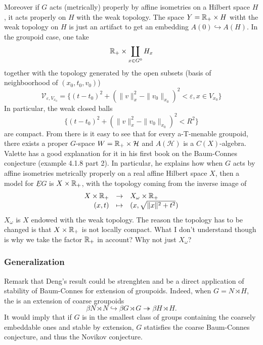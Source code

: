 Moreover if $G$ acts (metrically) properly by affine isometries on a Hilbert space $H$, it acts properly on $H$ with the weak topology. The space $Y = \mathbb R_+ \times H$ witht the weak topology on $H$ is just an artifact to get an embedding $A(0) \hookrightarrow A(H)$. In the groupoid case, one take
\[ \mathbb R_+ \times \coprod_{x\in G^0} H_x\]
together with the topology generated by the open subsets (basis of neighboorhood of $(x_0,t_0,v_0)$)
\[ \mathcal V_{\varepsilon, V_{x_0}} = \{ (t-t_0)^2 + (\| v\|_x^2 - \| v_0\|_{x_0} )^2 < \varepsilon , x\in V_{x_0}\} \]
In particular, the weak closed balls
\[  \{ (t-t_0)^2 + (\| v\|_x^2 - \| v_0\|_{x_0} )^2 < R^2 \}\]
are compact. From there is it easy to see that for every a-T-menable groupoid, there exists a proper $G$-space $W= \mathbb R_+\times \mathcal H$ and $A(\mathcal H)$ is a $C(X)$-algebra.\\

Valette has a good explanation for it in his first book on the Baum-Connes conjecture (example 4.1.8 part 2). In particular, he explains how when $G$ acts by affine isometries metrically properly on a real affine Hilbert space $X$, then a model for $\underline E G$ is $X\times \mathbb R_+$, with the topology coming from the inverse image of 
\[\begin{array}{rcl} X\times \mathbb R_+ & \rightarrow & X_\omega \times \mathbb R_+ \\ (x,t) & \mapsto & (x, \sqrt{\|x \|^2 + t^2})\end{array}\]  
$X_\omega$ is $X$ endowed with the weak topology. The reason the topology has to be changed is that $X\times \mathbb R_+$ is not locally compact. What I don't understand though is why we take the factor $\mathbb R_+$ in account? Why not just $X_\omega$?

\subsubsection*{Generalization}

Remark that Deng's result could be strenghten and be a direct application of stability of Baum-Connes for extension of groupoids. Indeed, when $G=N\rtimes H$, the is an extension of coarse groupoids
\[ \beta N \rtimes N\hookrightarrow  \beta G \rtimes G \twoheadrightarrow \beta H \rtimes H.\]
It would imply that if $G$ is in the smallest class of groups containing the coarsely embeddable ones and stable by extension, $G$ statisfies the coarse Baum-Connes conjecture, and thus the Novikov conjecture.\\

